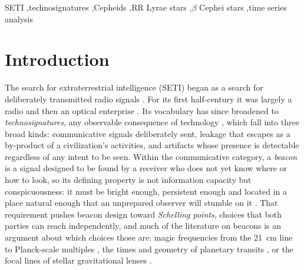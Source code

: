 \documentclass[final,5p]{elsarticle}
\begin{document}
\begin{frontmatter}
\begin{keyword}
SETI \sep technosignatures \sep Cepheids \sep RR Lyrae stars \sep $\beta$ Cephei stars \sep time series analysis
\end{keyword}

\end{frontmatter}

\section{Introduction}
\label{sec:intro}

The search for extraterrestrial intelligence (SETI) began as a search for deliberately transmitted radio signals \citep{Cocconi1959, Drake1961}. For its first half-century it was largely a radio and then an optical enterprise \citep{Tarter2001, Reines2002}. Its vocabulary has since broadened to \emph{technosignatures}, any observable consequence of technology \citep{Wright2018nomenclature, Wright2018taxonomy, Sheikh2020}, which fall into three broad kinds: communicative signals deliberately sent, leakage that escapes as a by-product of a civilization's activities, and artifacts whose presence is detectable regardless of any intent to be seen. Within the communicative category, a \emph{beacon} is a signal designed to be found by a receiver who does not yet know where or how to look, so its defining property is not information capacity but conspicuousness: it must be bright enough, persistent enough and located in a place natural enough that an unprepared observer will stumble on it \citep{Benford2010, Arnold2013, Messerschmitt2015, Wright2021strategies}. That requirement pushes beacon design toward \emph{Schelling points}, choices that both parties can reach independently, and much of the literature on beacons is an argument about which choices those are: magic frequencies from the 21~cm line to Planck-scale multiples \citep{Cocconi1959, Wright2021strategies}, the times and geometry of planetary transits \citep{Arnold2005, Kipping2016, Wright2016megastructures}, or the focal lines of stellar gravitational lenses \citep{Hippke2020network, Kerby2021, Gertz2022}.
\end{document}
